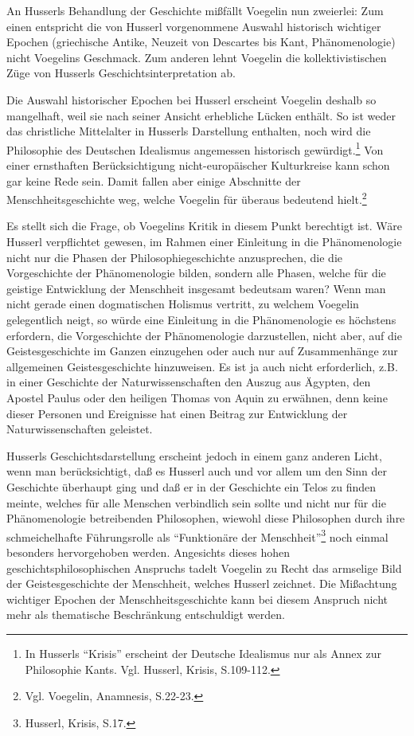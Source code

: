 An Husserls Behandlung der Geschichte mißfällt Voegelin nun zweierlei: Zum
einen entspricht die von Husserl vorgenommene Auswahl historisch wichtiger
Epochen (griechische Antike, Neuzeit von Descartes bis Kant, Phänomenologie)
nicht Voegelins Geschmack. Zum anderen lehnt Voegelin die kollektivistischen
Züge von Husserls Geschichtsinterpretation ab.

Die Auswahl historischer Epochen bei Husserl erscheint Voegelin deshalb so
mangelhaft, weil sie nach seiner Ansicht erhebliche Lücken enthält. So ist
weder das christliche Mittelalter in Husserls Darstellung enthalten, noch wird
die Philosophie des Deutschen Idealismus angemessen historisch
gewürdigt.\footnote{In Husserls "`Krisis"' erscheint der Deutsche Idealismus
  nur als Annex zur Philosophie Kants. Vgl. Husserl, Krisis, S.109-112.} Von
einer ernsthaften Berücksichtigung nicht-europäischer Kulturkreise kann schon
gar keine Rede sein. Damit fallen aber einige Abschnitte der
Menschheitsgeschichte weg, welche Voegelin für überaus bedeutend
hielt.\footnote{Vgl. Voegelin, Anamnesis, S.22-23.}

Es stellt sich die Frage, ob Voegelins Kritik in diesem Punkt berechtigt ist.
Wäre Husserl verpflichtet gewesen, im Rahmen einer Einleitung in die
Phänomenologie nicht nur die Phasen der Philosophiegeschichte anzusprechen,
die die Vorgeschichte der Phänomenologie bilden, sondern alle Phasen, welche
für die geistige Entwicklung der Menschheit insgesamt bedeutsam waren? Wenn
man nicht gerade einen dogmatischen Holismus vertritt, zu welchem Voegelin
gelegentlich neigt, so würde eine Einleitung in die Phänomenologie es
höchstens erfordern, die Vorgeschichte der Phänomenologie darzustellen, nicht
aber, auf die Geistesgeschichte im Ganzen einzugehen oder auch nur auf
Zusammenhänge zur allgemeinen Geistesgeschichte hinzuweisen. Es ist ja auch
nicht erforderlich, z.B. in einer Geschichte der Naturwissenschaften den Auszug
aus Ägypten, den Apostel Paulus oder den heiligen Thomas von Aquin zu
erwähnen, denn keine dieser Personen und Ereignisse hat einen Beitrag zur
Entwicklung der Naturwissenschaften geleistet. 

Husserls Geschichtsdarstellung erscheint jedoch in einem ganz anderen Licht,
wenn man berücksichtigt, daß es Husserl auch und vor allem um den Sinn der
Geschichte überhaupt ging und daß er in der Geschichte ein Telos zu finden
meinte, welches für alle Menschen verbindlich sein sollte und nicht nur für
die Phänomenologie betreibenden Philosophen, wiewohl diese Philosophen durch
ihre schmeichelhafte Führungsrolle als "`Funktionäre der
Menschheit"'\footnote{Husserl, Krisis, S.17.} noch einmal besonders
hervorgehoben werden. Angesichts dieses hohen geschichtsphilosophischen
Anspruchs tadelt Voegelin zu Recht das armselige Bild der Geistesgeschichte
der Menschheit, welches Husserl zeichnet. Die Mißachtung wichtiger Epochen der
Menschheitsgeschichte kann bei diesem Anspruch nicht mehr als thematische
Beschränkung entschuldigt werden.


